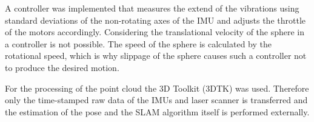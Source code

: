 A controller was implemented that measures the extend of the vibrations using standard deviations of the non-rotating axes of the IMU and adjusts the throttle of the motors accordingly.
Considering the translational velocity of the sphere in a controller is not possible.
The speed of the sphere is calculated by the rotational speed, which is why slippage of the sphere causes such a controller not to produce the desired motion. 

For the processing of the point cloud the 3D Toolkit (3DTK) was used.
Therefore only the time-stamped raw data of the IMUs and laser scanner is transferred and the estimation of the pose and the SLAM algorithm itself is performed externally.

